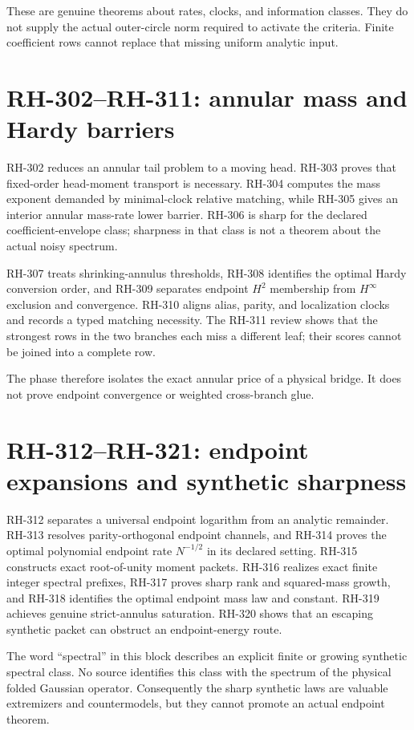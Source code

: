 \documentclass[11pt]{article}
\theoremstyle{definition}
\theoremstyle{remark}
\begin{document}
These are genuine theorems about rates, clocks, and information classes.
They do not supply the actual outer-circle norm required to activate the
criteria.  Finite coefficient rows cannot replace that missing uniform
analytic input.

\section{RH-302--RH-311: annular mass and Hardy barriers}

RH-302 reduces an annular tail problem to a moving head.  RH-303 proves that
fixed-order head-moment transport is necessary.  RH-304 computes the mass
exponent demanded by minimal-clock relative matching, while RH-305 gives an
interior annular mass-rate lower barrier.  RH-306 is sharp for the declared
coefficient-envelope class; sharpness in that class is not a theorem about
the actual noisy spectrum.

RH-307 treats shrinking-annulus thresholds, RH-308 identifies the optimal
Hardy conversion order, and RH-309 separates endpoint $H^2$ membership from
$H^\infty$ exclusion and convergence.  RH-310 aligns alias, parity, and
localization clocks and records a typed matching necessity.  The RH-311
review shows that the strongest rows in the two branches each miss a
different leaf; their scores cannot be joined into a complete row.

The phase therefore isolates the exact annular price of a physical bridge.
It does not prove endpoint convergence or weighted cross-branch glue.

\section{RH-312--RH-321: endpoint expansions and synthetic sharpness}

RH-312 separates a universal endpoint logarithm from an analytic remainder.
RH-313 resolves parity-orthogonal endpoint channels, and RH-314 proves the
optimal polynomial endpoint rate $N^{-1/2}$ in its declared setting.
RH-315 constructs exact root-of-unity moment packets.  RH-316 realizes exact
finite integer spectral prefixes, RH-317 proves sharp rank and squared-mass
growth, and RH-318 identifies the optimal endpoint mass law and constant.
RH-319 achieves genuine strict-annulus saturation.  RH-320 shows that an
escaping synthetic packet can obstruct an endpoint-energy route.

The word ``spectral'' in this block describes an explicit finite or growing
synthetic spectral class.  No source identifies this class with the spectrum
of the physical folded Gaussian operator.  Consequently the sharp synthetic
laws are valuable extremizers and countermodels, but they cannot promote an
actual endpoint theorem.
\end{document}
